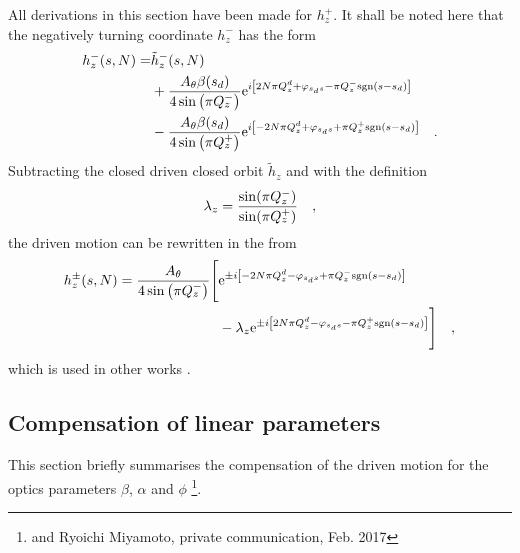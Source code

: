 All derivations in this section have been made for $h_z^+$. It shall be noted here that the negatively turning
coordinate $h_z^-$ has the form
%
\begin{align}
    h_z^-(s, N) =
        &\tilde{h}_z^-(s, N) \notag \\
        &+ \frac{A_\theta\beta(s_d)}{4\sin\left( \pi Q_z^-\right)}
        \text{e}^{i\left[2N\pi Q^{d}_{z} + \varphi_{s_ds} - \pi Q_z^-\text{sgn}(s-s_d)\right]} 
        \notag \\
        &- \frac{A_\theta\beta(s_d)}{4\sin\left( \pi Q_z^+\right)}
        \text{e}^{i\left[-2N\pi Q^{d}_{z} + \varphi_{s_ds} + \pi Q_z^+\text{sgn}(s-s_d)\right]} 
    \quad .
    \label{eq_driven_simpl2_minus}
\end{align}
%
Subtracting the closed driven closed orbit $\tilde{h}_z$ and with the definition
%
\begin{equation}
    \lambda_z = \frac{\sin(\pi Q_z^-)}{\sin(\pi Q_z^+)}
    \quad ,
\end{equation}
%
the driven motion can be rewritten in the from
%
\begin{align}
    h_z^\pm(s,N) = 
        \frac{A_\theta}{4\sin\left( \pi Q_z^-\right)}
        \Bigg[ 
            &\text{e}^{\pm i\left[-2N\pi Q^{d}_{z} - \varphi_{s_ds} + \pi Q_z^-\text{sgn}(s-s_d)\right]} 
            \notag \\
            &- \lambda_z
             \text{e}^{\pm i\left[2N\pi Q^{d}_{z} - \varphi_{s_ds} - \pi Q_z^+\text{sgn}(s-s_d)\right]} 
        \Bigg]
    \quad ,
    \label{eq_driven_hz_final}
\end{align}
%
which is used in other works \cite{Miyamoto2008, Miyamoto2010}. 

\subsection{Compensation of linear parameters}
\label{sec_comp}

This section briefly summarises the compensation of the driven motion for the optics parameters
$\beta$, $\alpha$ and $\phi$ \footnote{\cite{Miyamoto2008} and Ryoichi Miyamoto, private communication, Feb. 2017}.

